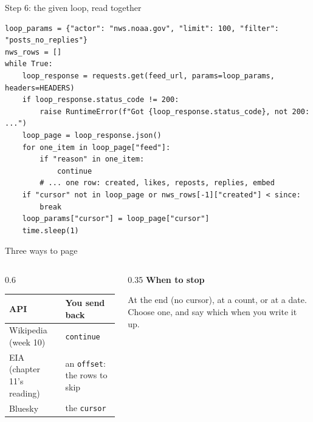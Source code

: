 \documentclass[9pt,aspectratio=169]{beamer}
\begin{document}
\begin{frame}[fragile]{Step 6: the given loop, read together}
\begin{lstlisting}
loop_params = {"actor": "nws.noaa.gov", "limit": 100, "filter": "posts_no_replies"}
nws_rows = []
while True:
    loop_response = requests.get(feed_url, params=loop_params, headers=HEADERS)
    if loop_response.status_code != 200:
        raise RuntimeError(f"Got {loop_response.status_code}, not 200: ...")
    loop_page = loop_response.json()
    for one_item in loop_page["feed"]:
        if "reason" in one_item:
            continue
        # ... one row: created, likes, reposts, replies, embed
    if "cursor" not in loop_page or nws_rows[-1]["created"] < since:
        break
    loop_params["cursor"] = loop_page["cursor"]
    time.sleep(1)
\end{lstlisting}
\end{frame}

\begin{frame}{Three ways to page}
    \begin{columns}[T]
        \begin{column}{0.6\textwidth}
            {\footnotesize
            \begin{tabular}{@{}ll@{}}
                \toprule
                \textbf{API} & \textbf{You send back} \\
                \midrule
                Wikipedia (week 10) & \texttt{continue} \\
                EIA (chapter 11's reading) & an \texttt{offset}: the rows to skip \\
                Bluesky & the \texttt{cursor} \\
                \bottomrule
            \end{tabular}\par}
        \end{column}
        \begin{column}{0.35\textwidth}
            \textbf{When to stop}\\[2pt]
            {\footnotesize At the end (no cursor), at a count, or at a date. Choose one, and say which when you write it up.\par}
        \end{column}
    \end{columns}
\end{frame}
\end{document}
